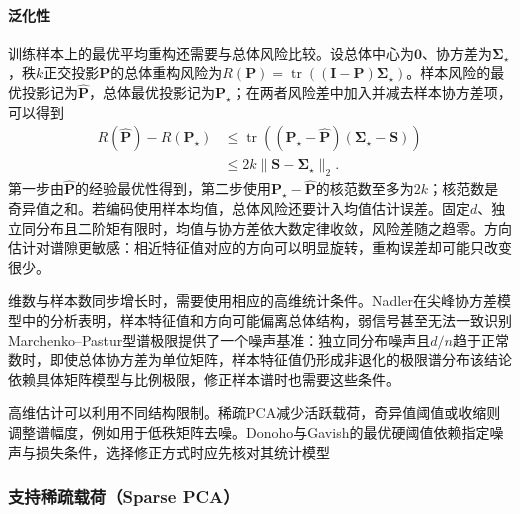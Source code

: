\paragraph{泛化性}

训练样本上的最优平均重构还需要与总体风险比较。设总体中心为$\bm{0}$、协方差为$\bm{\Sigma}_{\star}$，秩$k$正交投影$\bm{P}$的总体重构风险为$R(\bm{P})=\operatorname{tr}((\bm{I}-\bm{P})\bm{\Sigma}_{\star})$。样本风险的最优投影记为$\widehat{\bm{P}}$，总体最优投影记为$\bm{P}_{\star}$；在两者风险差中加入并减去样本协方差项，可以得到
\begin{equation}
  \begin{aligned}
  R(\widehat{\bm{P}})-R(\bm{P}_{\star})
  &\leq\operatorname{tr}
      ((\bm{P}_{\star}-\widehat{\bm{P}})
        (\bm{\Sigma}_{\star}-\bm{S}))\\
  &\leq 2k\lVert\bm{S}-\bm{\Sigma}_{\star}\rVert_2.
  \end{aligned}
  \label{eq:dim-pca-excess-risk}
\end{equation}
第一步由$\widehat{\bm{P}}$的经验最优性得到，第二步使用$\bm{P}_{\star}-\widehat{\bm{P}}$的核范数至多为$2k$；核范数是奇异值之和。若编码使用样本均值，总体风险还要计入均值估计误差。固定$d$、独立同分布且二阶矩有限时，均值与协方差依大数定律收敛，风险差随之趋零。方向估计对谱隙更敏感：相近特征值对应的方向可以明显旋转，重构误差却可能只改变很少。

维数与样本数同步增长时，需要使用相应的高维统计条件。Nadler在尖峰协方差模型中的分析表明，样本特征值和方向可能偏离总体结构，弱信号甚至无法一致识别Marchenko--Pastur型谱极限提供了一个噪声基准：独立同分布噪声且$d/n$趋于正常数时，即使总体协方差为单位矩阵，样本特征值仍形成非退化的极限谱分布该结论依赖具体矩阵模型与比例极限，修正样本谱时也需要这些条件。

高维估计可以利用不同结构限制。稀疏PCA减少活跃载荷，奇异值阈值或收缩则调整谱幅度，例如用于低秩矩阵去噪。Donoho与Gavish的最优硬阈值依赖指定噪声与损失条件，选择修正方式时应先核对其统计模型

\subsubsection{支持稀疏载荷（Sparse PCA）}
\label{sec:dim-sparse-pca}

